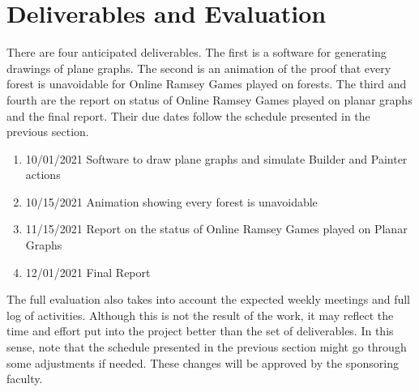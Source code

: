  
\section*{Deliverables and Evaluation}

There are four anticipated deliverables. The first is a software for generating drawings of plane graphs. The second is an animation of the proof that every forest is unavoidable for Online Ramsey Games played on forests. The third and fourth are the report on status of Online Ramsey Games played on planar graphs and the final report. Their due dates follow the schedule presented in the previous section. 

\begin{enumerate}
	\item 10/01/2021 Software to draw plane graphs and simulate Builder and Painter actions
	\item 10/15/2021 Animation showing every forest is unavoidable
	\item 11/15/2021 Report on the status of Online Ramsey Games played on Planar Graphs
	\item 12/01/2021 Final Report
\end{enumerate}


The full evaluation also takes into account the expected weekly meetings and full log of activities. Although this is not the result of the work, it may reflect the time and effort put into the project better than the set of deliverables. In this sense, note that the schedule presented in the previous section might go through some adjustments if needed. These changes will be approved by the sponsoring faculty.



